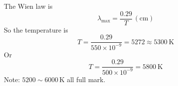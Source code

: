 The Wien law is
\begin{equation*}
\lambda_{\max} = \frac{0.29}{T}\,(\mathrm{cm}) \tag*{5}
\end{equation*}
So the temperature is
\begin{equation*}
T = \frac{0.29}{550\times 10^{-9}} = 5272 \approx 5300~\mathrm{K} \tag*{5}
\end{equation*}
Or
\[
T = \frac{0.29}{500\times 10^{-9}} = 5800~\mathrm{K}
\]
Note: $5200\sim6000$\,K all full mark.
